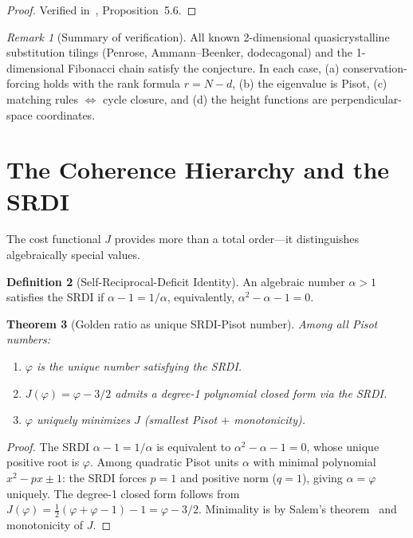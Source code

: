\documentclass[12pt]{article}
\newtheorem{theorem}{Theorem}[section]
\theoremstyle{definition}
\newtheorem{definition}[theorem]{Definition}
\theoremstyle{remark}
\newtheorem{remark}[theorem]{Remark}
\begin{document}
\begin{proof}
Verified in~\cite{PardoGuerraCohom2026}, Proposition~5.6.
\end{proof}

\begin{remark}[Summary of verification]
All known 2-dimensional quasicrystalline substitution tilings (Penrose, Ammann--Beenker, dodecagonal) and the 1-dimensional Fibonacci chain satisfy the conjecture. In each case, (a) conservation-forcing holds with the rank formula $r = N - d$, (b) the eigenvalue is Pisot, (c) matching rules $\Leftrightarrow$ cycle closure, and (d) the height functions are perpendicular-space coordinates.
\end{remark}


\section{The Coherence Hierarchy and the SRDI}
\label{sec:hierarchy}

The cost functional $J$ provides more than a total order---it distinguishes algebraically special values.

\begin{definition}[Self-Reciprocal-Deficit Identity]
\label{def:SRDI}
An algebraic number $\alpha > 1$ satisfies the SRDI if $\alpha - 1 = 1/\alpha$, equivalently, $\alpha^2 - \alpha - 1 = 0$.
\end{definition}

\begin{theorem}[Golden ratio as unique SRDI-Pisot number]
\label{thm:SRDI}
Among all Pisot numbers:
\begin{enumerate}
\item[(i)] $\varphi$ is the unique number satisfying the SRDI.
\item[(ii)] $J(\varphi) = \varphi - 3/2$ admits a degree-1 polynomial closed form via the SRDI.
\item[(iii)] $\varphi$ uniquely minimizes $J$ (smallest Pisot $+$ monotonicity).
\end{enumerate}
\end{theorem}

\begin{proof}
The SRDI $\alpha - 1 = 1/\alpha$ is equivalent to $\alpha^2 - \alpha - 1 = 0$, whose unique positive root is $\varphi$. Among quadratic Pisot units $\alpha$ with minimal polynomial $x^2 - px \pm 1$: the SRDI forces $p = 1$ and positive norm ($q = 1$), giving $\alpha = \varphi$ uniquely. The degree-1 closed form follows from $J(\varphi) = \frac{1}{2}(\varphi + \varphi - 1) - 1 = \varphi - 3/2$. Minimality is by Salem's theorem~\cite{Salem1963} and monotonicity of $J$.
\end{proof}
\end{document}
